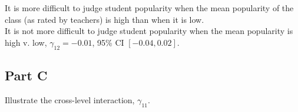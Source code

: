 \documentclass[]{article}
\newenvironment{Shaded}{\begin{snugshade}}{\end{snugshade}}
\newcommand{\KeywordTok}[1]{\textcolor[rgb]{0.13,0.29,0.53}{\textbf{#1}}}
\newcommand{\DataTypeTok}[1]{\textcolor[rgb]{0.13,0.29,0.53}{#1}}
\newcommand{\DecValTok}[1]{\textcolor[rgb]{0.00,0.00,0.81}{#1}}
\newcommand{\StringTok}[1]{\textcolor[rgb]{0.31,0.60,0.02}{#1}}
\newcommand{\CommentTok}[1]{\textcolor[rgb]{0.56,0.35,0.01}{\textit{#1}}}
\newcommand{\OperatorTok}[1]{\textcolor[rgb]{0.81,0.36,0.00}{\textbf{#1}}}
\newcommand{\NormalTok}[1]{#1}
\begin{document}
It is more difficult to judge student popularity when the mean
popularity of the class (as rated by teachers) is high than when it is
low.\\
It is not more difficult to judge student popularity when the mean
popularity is high v. low, \(\gamma_{12} = -0.01\), 95\% CI
\([-0.04, 0.02]\).

\subsection{Part C}\label{part-c-1}

Illustrate the cross-level interaction, \(\gamma_{11}\).

\begin{Shaded}
\end{Shaded}
\end{document}
